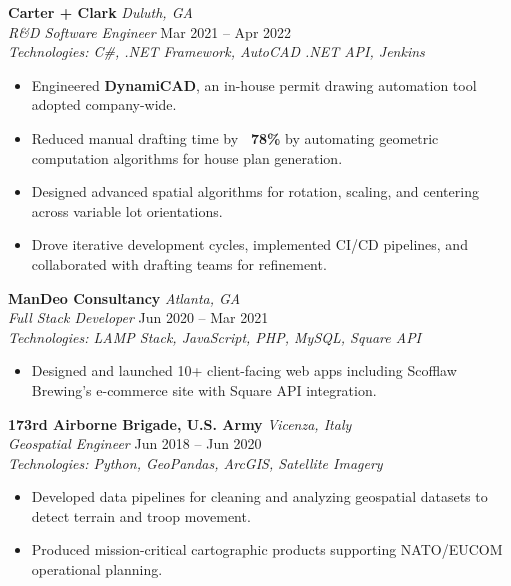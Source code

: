 \documentclass[a4paper,10pt]{article}
\begin{document}
\vspace{4pt}
\textbf{Carter + Clark} \hfill \textit{Duluth, GA} \\
\textit{R\&D Software Engineer} \hfill Mar 2021 -- Apr 2022 \\
\textit{Technologies: C\#, .NET Framework, AutoCAD .NET API, Jenkins}
\begin{itemize}[leftmargin=*]
    \item Engineered \textbf{DynamiCAD}, an in-house permit drawing automation tool adopted company-wide.
    \item Reduced manual drafting time by \textbf{~78\%} by automating geometric computation algorithms for house plan generation.
    \item Designed advanced spatial algorithms for rotation, scaling, and centering across variable lot orientations.
    \item Drove iterative development cycles, implemented CI/CD pipelines, and collaborated with drafting teams for refinement.
\end{itemize}

\vspace{4pt}
\textbf{ManDeo Consultancy} \hfill \textit{Atlanta, GA} \\
\textit{Full Stack Developer} \hfill Jun 2020 -- Mar 2021 \\
\textit{Technologies: LAMP Stack, JavaScript, PHP, MySQL, Square API}
\begin{itemize}[leftmargin=*]
    \item Designed and launched 10+ client-facing web apps including Scofflaw Brewing’s e-commerce site with Square API integration.
\end{itemize}

\vspace{4pt}
\textbf{173rd Airborne Brigade, U.S. Army} \hfill \textit{Vicenza, Italy} \\
\textit{Geospatial Engineer} \hfill Jun 2018 -- Jun 2020 \\
\textit{Technologies: Python, GeoPandas, ArcGIS, Satellite Imagery}
\begin{itemize}[leftmargin=*]
    \item Developed data pipelines for cleaning and analyzing geospatial datasets to detect terrain and troop movement.
    \item Produced mission-critical cartographic products supporting NATO/EUCOM operational planning.
\end{itemize}

\end{document}
